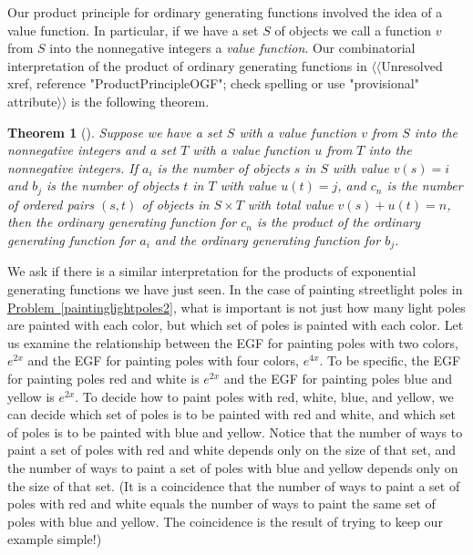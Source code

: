 \documentclass[10pt,]{book}
\theoremstyle{plain}
\newtheorem{theorem}{Theorem}[section]
\theoremstyle{definition}
\numberwithin{equation}{chapter}
\begin{document}
Our product principle for ordinary generating functions involved the idea of a value function. In particular, if we have a set \(S\) of objects we call a function \(v\) from \(S\) into the nonnegative integers a \emph{value function}. Our combinatorial interpretation of the product of ordinary generating functions in {$\langle\langle$Unresolved xref, reference "ProductPrincipleOGF"; check spelling or use "provisional" attribute$\rangle\rangle$} is the following theorem.%
\begin{theorem}[{}]\label{theorem-2}
Suppose we have a set \(S\) with a value function \(v\) from \(S\) into the nonnegative integers and a set \(T\) with a value function \(u\) from \(T\) into the nonnegative integers. If \(a_i\) is the number of objects \(s\) in \(S\) with value \(v(s) =i\) and \(b_j\) is the number of objects \(t\) in \(T\) with value \(u(t)= j\), and \(c_n\) is the number of ordered pairs \((s,t)\) of objects in \(S\times T\) with total value \(v(s) + u(t) =n\), then the ordinary generating function for \(c_n\) is the product of the ordinary generating function for \(a_i\) and the ordinary generating function for \(b_j\).%
\end{theorem}
We ask if there is a similar interpretation for the products of exponential generating functions we have just seen. In the case of painting streetlight poles in \hyperref[paintinglightpoles2]{Problem~\ref{paintinglightpoles2}}, what is important is not just how many light poles are painted with each color, but which set of poles is painted with each color. Let us examine the relationship between the EGF for painting poles with two colors, \(e^{2x}\) and the EGF for painting poles with four colors, \(e^{4x}\). To be specific, the EGF for painting poles red and white is \(e^{2x}\) and the EGF for painting poles blue and yellow is \(e^{2x}\). To decide how to paint poles with red, white, blue, and yellow, we can decide which set of poles is to be painted with red and white, and which set of poles is to be painted with blue and yellow. Notice that the number of ways to paint a set of poles with red and white depends only on the size of that set, and the number of ways to paint a set of poles with blue and yellow depends only on the size of that set. (It is a coincidence that the number of ways to paint a set of poles with red and white equals the number of ways to paint the same set of poles with blue and yellow. The coincidence is the result of trying to keep our example simple!)%
\end{document}
